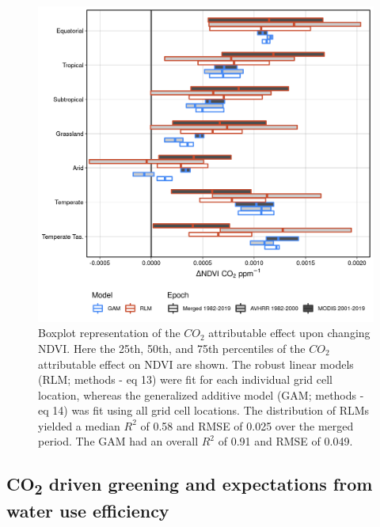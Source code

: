 \documentclass[gc, manuscript]{copernicus}
\begin{document}
\clearpage
\begin{figure}
\includegraphics[width=14cm]{../../figures/Fig6_rlm_CO2_effect_by_epoch} \caption{Boxplot representation of the $CO_2$ attributable effect upon changing NDVI. Here the 25th, 50th, and 75th percentiles of the $CO_2$ attributable effect on NDVI are shown. The robust linear models (RLM; methods - eq 13) were fit for each individual grid cell location, whereas the generalized additive model (GAM; methods - eq 14) was fit using all grid cell locations. The distribution of RLMs yielded a median $R^2$ of 0.58 and RMSE of 0.025 over the merged period. The GAM had an overall $R^2$ of 0.91 and RMSE of 0.049.}\label{fig:unnamed-chunk-5}
\end{figure}
\clearpage

\subsection{\texorpdfstring{CO\textsubscript{2} driven greening and
expectations from water use
efficiency}{CO2 driven greening and expectations from water use efficiency}}
\end{document}
